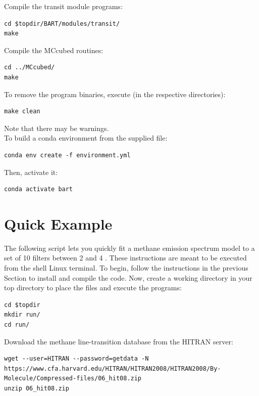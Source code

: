\documentclass[letterpaper, 12pt]{article}
\begin{document}
\noindent Compile the transit module programs:
\begin{verbatim}
cd $topdir/BART/modules/transit/
make
\end{verbatim}

\noindent Compile the {\tttm MCcubed} routines:
\begin{verbatim}
cd ../MCcubed/
make
\end{verbatim}

\noindent To remove the program binaries, execute (in the respective
directories):
\begin{verbatim}
make clean
\end{verbatim}

\noindent Note that there may be warnings. \\

\noindent To build a conda environment from the supplied file:
\begin{verbatim}
conda env create -f environment.yml
\end{verbatim}

\noindent Then, activate it:
\begin{verbatim}
conda activate bart
\end{verbatim}

\section{Quick Example}
\label{sec:quick-example}

The following script lets you quickly fit a methane emission spectrum
model to a set of 10 filters between 2 and 4 {\microns}.  These
instructions are meant to be executed from the shell Linux terminal.  To
begin, follow the instructions in the previous Section to install and
compile the code. Now, create a working directory in your top
directory to place the files and execute the programs:

{\fontsize{9.8}{1em}\selectfont 
\begin{verbatim}
cd $topdir
mkdir run/
cd run/
\end{verbatim}}

\noindent Download the methane line-transition database from the HITRAN server:

{\fontsize{9.8}{1em}\selectfont 
\begin{lstlisting}[breaklines]
wget --user=HITRAN --password=getdata -N https://www.cfa.harvard.edu/HITRAN/HITRAN2008/HITRAN2008/By-Molecule/Compressed-files/06_hit08.zip 
unzip 06_hit08.zip
\end{lstlisting}}
\end{document}
